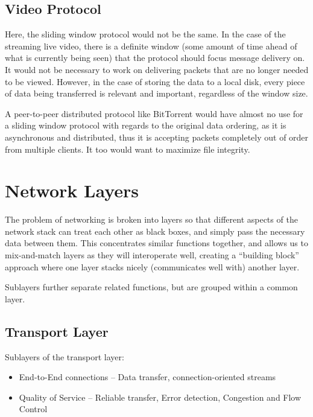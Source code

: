 \documentclass{article}
\begin{document}
\subsection{Video Protocol}
Here, the sliding window protocol would not be the same. In the case of the streaming live video, there is a definite window (some amount of time ahead of what is currently being seen) that the protocol should focus message delivery on. It would not be necessary to work on delivering packets that are no longer needed to be viewed. However, in the case of storing the data to a local disk, every piece of data being transferred is relevant and important, regardless of the window size.

A peer-to-peer distributed protocol like BitTorrent would have almost no use for a sliding window protocol with regards to the original data ordering, as it is asynchronous and distributed, thus it is accepting packets completely out of order from multiple clients. It too would want to maximize file integrity.

\section{Network Layers}
The problem of networking is broken into layers so that different aspects of the network stack can treat each other as black boxes, and simply pass the necessary data between them. This concentrates similar functions together, and allows us to mix-and-match layers as they will interoperate well, creating a ``building block'' approach where one layer stacks nicely (communicates well with) another layer.

Sublayers further separate related functions, but are grouped within a common layer. 
\subsection{Transport Layer}
Sublayers of the transport layer:
\begin{itemize}
\item End-to-End connections -- Data transfer, connection-oriented streams 
\item Quality of Service -- Reliable transfer, Error detection, Congestion and Flow Control
\end{itemize}
\end{document}
